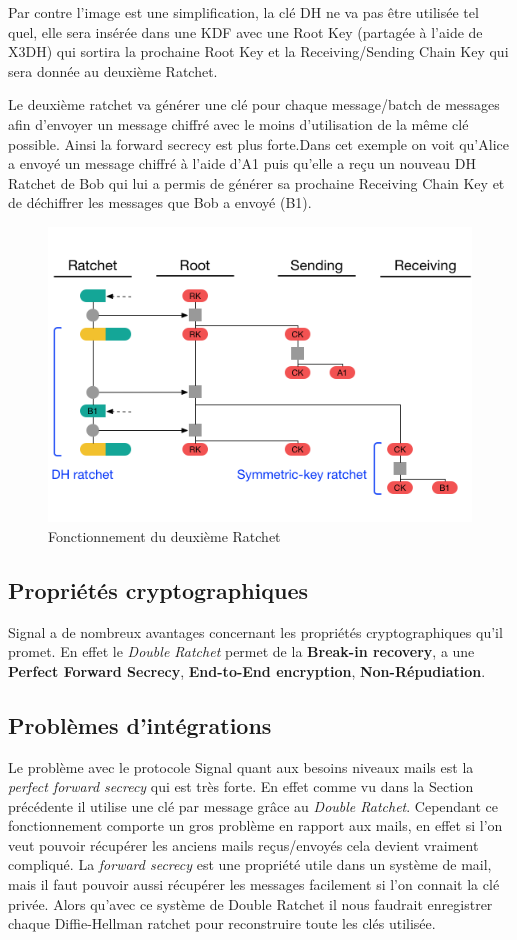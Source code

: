 Par contre l'image est une simplification, la clé DH ne va pas être utilisée tel quel, elle sera insérée dans une KDF avec une Root Key (partagée à l'aide de X3DH) qui sortira la prochaine Root Key et la Receiving/Sending Chain Key qui sera donnée au deuxième Ratchet.

Le deuxième ratchet va générer une clé pour chaque message/batch de messages afin d'envoyer un message chiffré avec le moins d'utilisation de la même clé possible. Ainsi la forward secrecy est plus forte.Dans cet exemple on voit qu'Alice a envoyé un message chiffré à l'aide d'A1 puis qu'elle a reçu un nouveau DH Ratchet de Bob qui lui a permis de générer sa prochaine Receiving Chain Key et de déchiffrer les messages que Bob a envoyé (B1).

\begin{figure}[h!]
	\centering
	\includegraphics[width=12cm]{images/secondRatchet.png}
	\caption{Fonctionnement du deuxième Ratchet~\cite{doubleratchet}}
	\label{fig:signalSecond}
\end{figure}

\subsection{Propriétés cryptographiques}
Signal a de nombreux avantages concernant les propriétés cryptographiques qu'il promet. En effet le \textit{Double Ratchet} permet de la \textbf{Break-in recovery}, a une \textbf{Perfect Forward Secrecy}, \textbf{End-to-End encryption}, \textbf{Non-Répudiation}.
\subsection{Problèmes d'intégrations}
Le problème avec le protocole Signal quant aux besoins niveaux mails est la \textit{perfect forward secrecy} qui est très forte. En effet comme vu dans la Section précédente il utilise une clé par message grâce au \textit{Double Ratchet}. Cependant ce fonctionnement comporte un gros problème en rapport aux mails, en effet si l'on veut pouvoir récupérer les anciens mails reçus/envoyés cela devient vraiment compliqué. La \textit{forward secrecy} est une propriété utile dans un système de mail, mais il faut pouvoir aussi récupérer les messages facilement si l'on connait la clé privée. Alors qu'avec ce système de Double Ratchet il nous faudrait enregistrer chaque Diffie-Hellman ratchet pour reconstruire toute les clés utilisée.
